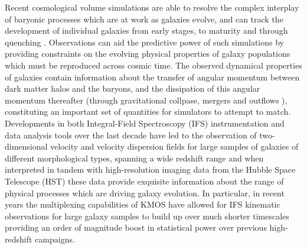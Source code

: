 \documentclass[fleqn,usenatbib]{mn2e}
\begin{document}
Recent cosmological volume simulations are able to resolve the complex interplay of baryonic processes which are at work as galaxies evolve, and can track the development of individual galaxies from early stages, to maturity and through quenching \citep{Dubois2014a,Vogelsberger2014b,Schaye2015}.
Observations can aid the predictive power of such simulations by providing constraints on the evolving physical properties of galaxy populations which must be reproduced across cosmic time.
The observed dynamical properties of galaxies contain information about the transfer of angular momentum between dark matter halos and the baryons, and the dissipation of this angular momentum thereafter (through gravitational collpase, mergers and outflows \cite[e.g.][]{Fall1983,Romanowsky2012,Fall2013}), constituting an important set of quantities for simulators to attempt to match.
Developments in both Integral-Field Spectroscopy (IFS) instrumentation and data analysis tools over the last decade have led to the observation of two-dimensional velocity and velocity dispersion fields for large samples of galaxies of different morphological types, spanning a wide redshift range \citep[e.g.][]{Sarzi2005,Flores2006,Epinat2008,ForsterSchreiber2009,Cappellari2011,Gnerucci2011,Epinat2012,Croom2012,Bundy2015,Wisnioski2015,Stott2016} and when interpreted in tandem with high-resolution imaging data from the Hubble Space Telescope (HST) these data provide exquisite information about the range of physical processes which are driving galaxy evolution.
In particular, in recent years the multiplexing capabilities of KMOS have allowed for IFS kinematic observations for large galaxy samples to build up over much shorter timescales \citep{Sobral2013,Wisnioski2015,Stott2016,Harrison2016,Mason2016} providing an order of magnitude boost in statistical power over previous high-redshift campaigns.    
\end{document}
